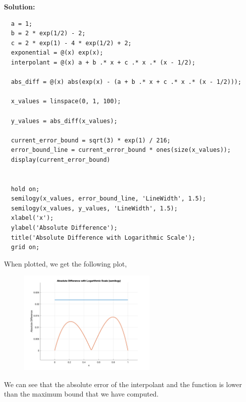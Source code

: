 \documentclass[11pt]{article}
\newenvironment{solution}
  {\par\noindent\textbf{Solution:}\par}
  {\par}
\begin{document}
\begin{enumerate}
\begin{enumerate}
\begin{solution}
  \begin{verbatim}
  a = 1;
  b = 2 * exp(1/2) - 2;
  c = 2 * exp(1) - 4 * exp(1/2) + 2;
  exponential = @(x) exp(x);
  interpolant = @(x) a + b .* x + c .* x .* (x - 1/2);
  
  abs_diff = @(x) abs(exp(x) - (a + b .* x + c .* x .* (x - 1/2)));

  x_values = linspace(0, 1, 100);

  y_values = abs_diff(x_values);

  current_error_bound = sqrt(3) * exp(1) / 216;
  error_bound_line = current_error_bound * ones(size(x_values));
  display(current_error_bound)


  hold on;
  semilogy(x_values, error_bound_line, 'LineWidth', 1.5);
  semilogy(x_values, y_values, 'LineWidth', 1.5);
  xlabel('x');
  ylabel('Absolute Difference');
  title('Absolute Difference with Logarithmic Scale');
  grid on;
  \end{verbatim}
  
  When plotted, we get the following plot,
\begin{figure}[H]
    \centering
    \includegraphics[width=0.6\textwidth]{q6d_plot.png} 
  \end{figure}
  We can see that the absolute error of the interpolant and the function is lower than the maximum bound that we have computed.

\end{solution}


\end{enumerate}

 \end{enumerate}
\end{document}
